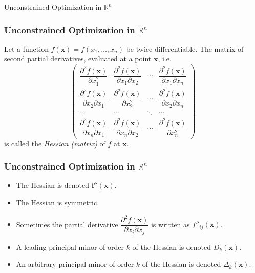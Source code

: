 \documentclass[10pt]{beamer}
\theoremstyle{definition}
\begin{document}
\begin{section}{Unconstrained Optimization in $ \mathbb{R}^n $}
\begin{frame}[fragile]
\frametitle{Unconstrained Optimization in $ \mathbb{R}^n $}
Let a function $ f(\mathbf{x})=f(x_1,\ldots,x_n) $ be twice differentiable. The matrix of second partial derivatives, evaluated at a point $ \mathbf{x} $, i.e. \[ \begin{pmatrix}
\dfrac{\partial^2 f(\mathbf{x})}{\partial x_1^2 } & \dfrac{\partial^2 f(\mathbf{x})}{\partial x_1 \partial x_2} & \cdots & \dfrac{\partial^2 f(\mathbf{x})}{\partial x_1 \partial x_n}\\[3ex]
\dfrac{\partial^2 f(\mathbf{x})}{\partial x_2\partial x_1 } & \dfrac{\partial^2 f(\mathbf{x})}{\partial x_2^2} & \cdots & \dfrac{\partial^2 f(\mathbf{x})}{\partial x_2 \partial x_n}\\[3ex]
\cdots & \cdots & \ddots & \cdots \\[3ex]
\dfrac{\partial^2 f(\mathbf{x})}{\partial x_n \partial x_1 } & \dfrac{\partial^2 f(\mathbf{x})}{\partial x_n \partial x_2 } & \cdots & \dfrac{\partial^2 f(\mathbf{x})}{\partial x_n^2}
\end{pmatrix} \] is called the \emph{Hessian (matrix)} of $ f $ at $ \mathbf{x} $.
\end{frame}

\begin{frame}[fragile]
\frametitle{Unconstrained Optimization in $ \mathbb{R}^n $}
\begin{itemize}
\item The Hessian is denoted $ \mathbf{f''(x)} $. \bigskip
\item The Hessian is symmetric. \bigskip
\item Sometimes the partial derivative $ \dfrac{\partial^2 f(\mathbf{x})}{\partial x_i \partial x_j} $ is written as $ f''_{ij}(\mathbf{x}) $. \bigskip
\item A leading principal minor of order $ k $ of the Hessian is denoted $ D_k(\mathbf{x}) $. \bigskip
\item An arbitrary principal minor of order $ k $ of the Hessian is denoted $ \Delta_k(\mathbf{x}) $.
\end{itemize}

\end{frame}


\end{section}
\end{document}
